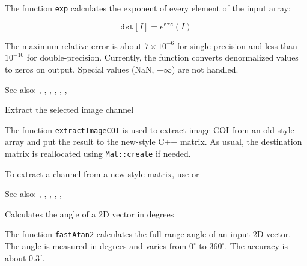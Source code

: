 The function \texttt{exp} calculates the exponent of every element of the input array:

\[
\texttt{dst} [I] = e^{\texttt{src}}(I)
\]

The maximum relative error is about $7 \times 10^{-6}$ for single-precision and less than $10^{-10}$ for double-precision. Currently, the function converts denormalized values to zeros on output. Special values (NaN, $\pm \infty$) are not handled.

See also: , , , , , , 


Extract the selected image channel

\begin{description}
\end{description}

The function \texttt{extractImageCOI} is used to extract image COI from an old-style array and put the result to the new-style C++ matrix. As usual, the destination matrix is reallocated using \texttt{Mat::create} if needed.

To extract a channel from a new-style matrix, use  or 

See also: , , , , , 


Calculates the angle of a 2D vector in degrees

\begin{description}
\end{description}

The function \texttt{fastAtan2} calculates the full-range angle of an input 2D vector. The angle is 
measured in degrees and varies from $0^\circ$ to $360^\circ$. The accuracy is about $0.3^\circ$.


